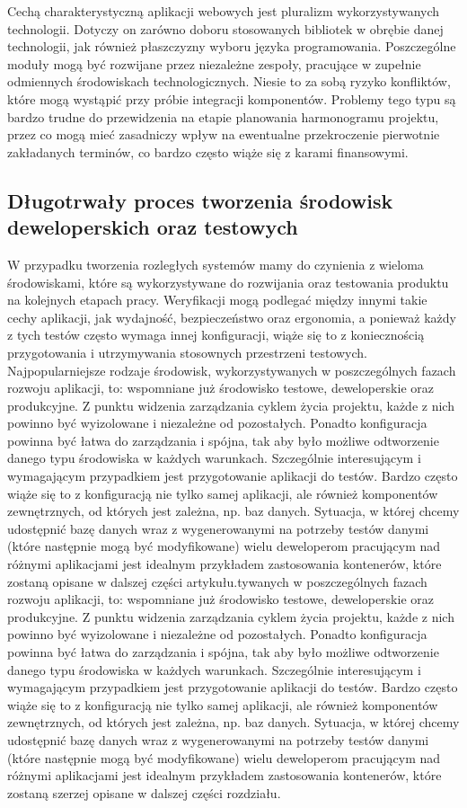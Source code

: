 Cechą charakterystyczną aplikacji webowych jest pluralizm wykorzystywanych technologii. Dotyczy on zarówno doboru stosowanych bibliotek w obrębie danej technologii, jak również płaszczyzny wyboru języka programowania. Poszczególne moduły mogą być rozwijane przez niezależne zespoły, pracujące w zupełnie odmiennych środowiskach technologicznych. Niesie to za sobą ryzyko konfliktów, które mogą wystąpić przy próbie integracji komponentów. Problemy tego typu są bardzo trudne do przewidzenia na etapie planowania harmonogramu projektu, przez co mogą mieć zasadniczy wpływ na ewentualne przekroczenie pierwotnie zakładanych terminów, co bardzo często wiąże się z karami finansowymi.

\subsection{Długotrwały proces tworzenia środowisk deweloperskich oraz testowych}

W przypadku tworzenia rozległych systemów mamy do czynienia z wieloma środowiskami, które są wykorzystywane do rozwijania oraz testowania produktu na kolejnych etapach pracy. Weryfikacji mogą podlegać między innymi takie cechy aplikacji, jak wydajność, bezpieczeństwo oraz ergonomia, a ponieważ każdy z tych testów często wymaga innej konfiguracji, wiąże się to z koniecznością przygotowania i utrzymywania stosownych przestrzeni testowych. Najpopularniejsze rodzaje środowisk, wykorzystywanych w poszczególnych fazach rozwoju aplikacji, to: wspomniane już środowisko testowe, deweloperskie oraz produkcyjne. Z punktu widzenia zarządzania cyklem życia projektu, każde z nich powinno być wyizolowane i niezależne od pozostałych. Ponadto konfiguracja powinna być łatwa do zarządzania i spójna, tak aby było możliwe odtworzenie danego typu środowiska w każdych warunkach. Szczególnie interesującym i wymagającym przypadkiem jest przygotowanie aplikacji do testów. Bardzo często wiąże się to z konfiguracją nie tylko samej aplikacji, ale również komponentów zewnętrznych, od których jest zależna, np. baz danych. Sytuacja, w której chcemy udostępnić bazę danych wraz z wygenerowanymi na potrzeby testów danymi (które następnie mogą być modyfikowane) wielu deweloperom pracującym nad różnymi aplikacjami jest idealnym przykładem zastosowania kontenerów, które zostaną opisane w dalszej części artykułu.tywanych w poszczególnych fazach rozwoju aplikacji, to: wspomniane już środowisko testowe, deweloperskie oraz produkcyjne. Z punktu widzenia zarządzania cyklem życia projektu, każde z nich powinno być wyizolowane i niezależne od pozostałych. Ponadto konfiguracja powinna być łatwa do zarządzania i spójna, tak aby było możliwe odtworzenie danego typu środowiska w każdych warunkach. Szczególnie interesującym i wymagającym przypadkiem jest przygotowanie aplikacji do testów. Bardzo często wiąże się to z konfiguracją nie tylko samej aplikacji, ale również komponentów zewnętrznych, od których jest zależna, np. baz danych. Sytuacja, w której chcemy udostępnić bazę danych wraz z wygenerowanymi na potrzeby testów danymi (które następnie mogą być modyfikowane) wielu deweloperom pracującym nad różnymi aplikacjami jest idealnym przykładem zastosowania kontenerów, które zostaną szerzej opisane w dalszej części rozdziału.

